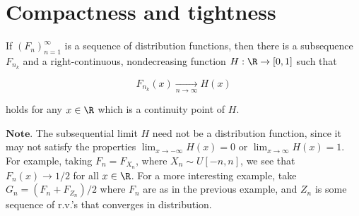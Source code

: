 \section{Compactness and tightness}

\begin{thm}
\label{thm-helly}
If $(F_n)_{n=1}^\infty$ is a sequence of distribution
functions, then there is a subsequence $F_{n_k}$ and
a right-continuous, nondecreasing function
$H:\R\to[0,1]$ such that

\[
F_{n_k}(x)\xrightarrow[n\to\infty]{} H(x)
\]

\noindent holds for any $x\in\R$ which is a continuity point of
$H$.
\end{thm}

\noindent $\textbf{Note.}$ The subsequential limit $H$ need not
be a distribution function, since it may not satisfy
the properties $\lim_{x\to-\infty} H(x) = 0$ or
$\lim_{x\to\infty} H(x)=1$. For example, taking
$F_n = F_{X_n}$, where $X_n \sim U[-n,n]$, we see
that $F_n(x)\to 1/2$ for all $x\in\R$. For a more
interesting example, take $G_n = (F_n + F_{Z_n})/2$
where $F_n$ are as in the previous example, and $Z_n$
is some sequence of r.v.'s that converges in
distribution.


